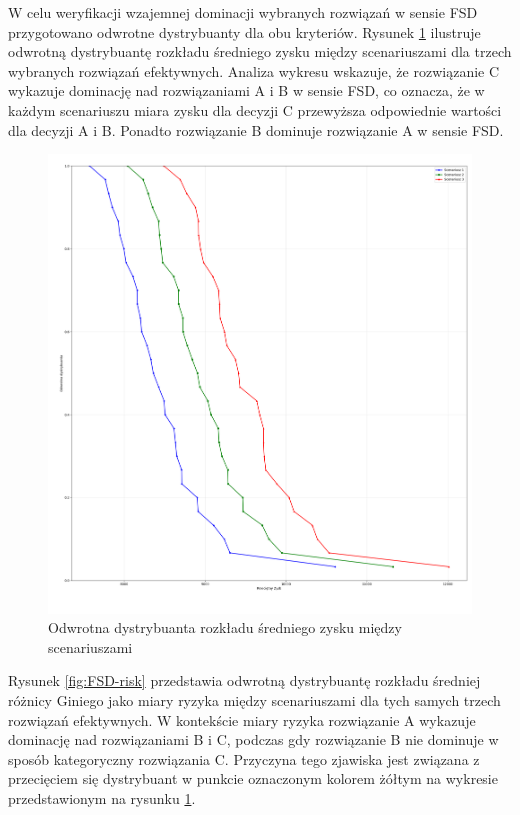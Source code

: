 \documentclass[11pt,a4paper]{article}
\begin{document}
W celu weryfikacji wzajemnej dominacji wybranych rozwiązań w sensie FSD przygotowano odwrotne dystrybuanty 
dla obu kryteriów. Rysunek \ref{fig:FSD-profit} ilustruje odwrotną dystrybuantę rozkładu średniego 
zysku między scenariuszami dla trzech wybranych rozwiązań efektywnych. Analiza wykresu wskazuje, 
że rozwiązanie C wykazuje dominację nad rozwiązaniami A i B w sensie FSD, co oznacza, że w 
każdym scenariuszu miara zysku dla decyzji C przewyższa odpowiednie wartości dla decyzji A i B. 
Ponadto rozwiązanie B dominuje rozwiązanie A w sensie FSD.

\begin{figure}[ht!]
\centering
\includegraphics[width=\textwidth]{graphics/zysk_dystrybuanta.png}
\caption{Odwrotna dystrybuanta rozkładu średniego zysku między scenariuszami}
\label{fig:FSD-profit}
\end{figure}

Rysunek \ref{fig:FSD-risk} przedstawia odwrotną dystrybuantę rozkładu średniej różnicy Giniego jako miary ryzyka między scenariuszami dla tych samych trzech rozwiązań efektywnych. W kontekście miary ryzyka rozwiązanie A wykazuje dominację nad rozwiązaniami B i C, podczas gdy rozwiązanie B nie dominuje w sposób kategoryczny rozwiązania C. Przyczyna tego zjawiska jest związana z przecięciem się dystrybuant w punkcie oznaczonym kolorem żółtym na wykresie przedstawionym na rysunku \ref{fig:FSD-profit}.
\end{document}
